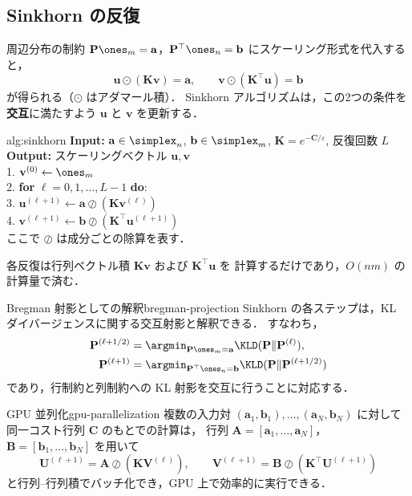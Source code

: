 \subsection{Sinkhorn の反復}

周辺分布の制約 $\mathbf{P}\ones_m = \mathbf{a}$，$\mathbf{P}^\top \ones_n = \mathbf{b}$
にスケーリング形式を代入すると，
\[
  \mathbf{u} \odot (\mathbf{K} \mathbf{v}) = \mathbf{a}, \qquad
  \mathbf{v} \odot (\mathbf{K}^\top \mathbf{u}) = \mathbf{b}
\]
が得られる（$\odot$ はアダマール積）．
Sinkhorn アルゴリズムは，この2つの条件を\textbf{交互}に満たすよう
$\mathbf{u}$ と $\mathbf{v}$ を更新する．

\begin{algorithm}{alg:sinkhorn}
  \textbf{Input:} $\mathbf{a} \in \simplex_n$, $\mathbf{b} \in \simplex_m$,
  $\mathbf{K} = e^{-\mathbf{C}/\varepsilon}$, 反復回数 $L$ \\
  \textbf{Output:} スケーリングベクトル $\mathbf{u}, \mathbf{v}$ \\[4pt]
  1. $\mathbf{v}^{(0)} \leftarrow \ones_m$ \\
  2. \textbf{for} $\ell = 0, 1, \ldots, L-1$ \textbf{do}: \\
  3. \quad $\mathbf{u}^{(\ell+1)} \leftarrow \mathbf{a} \oslash (\mathbf{K} \mathbf{v}^{(\ell)})$ \\
  4. \quad $\mathbf{v}^{(\ell+1)} \leftarrow \mathbf{b} \oslash (\mathbf{K}^\top \mathbf{u}^{(\ell+1)})$ \\[4pt]
  ここで $\oslash$ は成分ごとの除算を表す．
\end{algorithm}

各反復は行列ベクトル積 $\mathbf{K}\mathbf{v}$ および $\mathbf{K}^\top \mathbf{u}$ を
計算するだけであり，$O(nm)$ の計算量で済む．

\begin{remark}{Bregman 射影としての解釈}{bregman-projection}
  Sinkhorn の各ステップは，KL ダイバージェンスに関する交互射影と解釈できる．
  すなわち，
  \begin{align*}
    \mathbf{P}^{(\ell+1/2)}
      &= \argmin_{\mathbf{P}\ones_m = \mathbf{a}} \KLD(\mathbf{P} \| \mathbf{P}^{(\ell)}),
    \\
    \mathbf{P}^{(\ell+1)}
      &= \argmin_{\mathbf{P}^\top \ones_n = \mathbf{b}}
      \KLD(\mathbf{P} \| \mathbf{P}^{(\ell+1/2)})
  \end{align*}
  であり，行制約と列制約への KL 射影を交互に行うことに対応する．
\end{remark}

\begin{remark}{GPU 並列化}{gpu-parallelization}
  複数の入力対 $(\mathbf{a}_1, \mathbf{b}_1), \ldots, (\mathbf{a}_N, \mathbf{b}_N)$ に対して
  同一コスト行列 $\mathbf{C}$ のもとでの計算は，
  行列 $\mathbf{A} = [\mathbf{a}_1, \ldots, \mathbf{a}_N]$，
  $\mathbf{B} = [\mathbf{b}_1, \ldots, \mathbf{b}_N]$ を用いて
  \[
    \mathbf{U}^{(\ell+1)} = \mathbf{A} \oslash (\mathbf{K} \mathbf{V}^{(\ell)}), \qquad
    \mathbf{V}^{(\ell+1)} = \mathbf{B} \oslash (\mathbf{K}^\top \mathbf{U}^{(\ell+1)})
  \]
  と行列--行列積でバッチ化でき，GPU 上で効率的に実行できる．
\end{remark}


